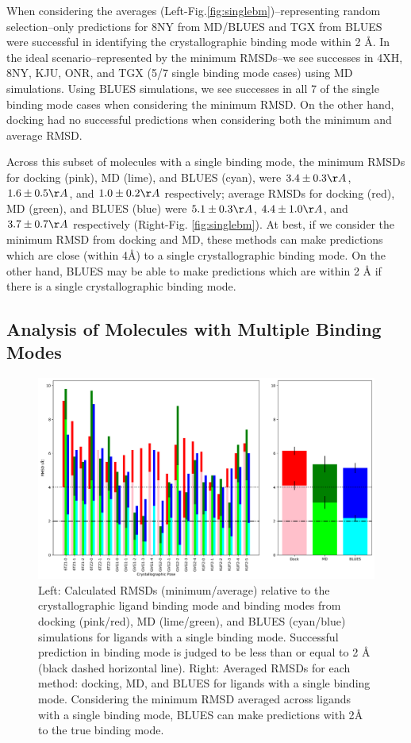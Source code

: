When considering the averages (Left-Fig.\ref{fig:singlebm})--representing random selection--only predictions for 8NY from MD/BLUES and TGX from BLUES were successful in identifying the crystallographic binding mode within 2 {\AA}.
In the ideal scenario--represented by the minimum RMSDs--we see successes in 4XH, 8NY, KJU, ONR, and TGX (5/7 single binding mode cases) using MD simulations.
Using BLUES simulations, we see successes in all 7 of the single binding mode cases when considering the minimum RMSD.
On the other hand, docking had no successful predictions when considering both the minimum and average RMSD.

Across this subset of molecules with a single binding mode, the minimum RMSDs for docking (pink), MD (lime), and BLUES (cyan), were $3.4 \pm 0.3 {\AA}$, $1.6 \pm 0.5 {\AA}$, and $1.0 \pm 0.2 {\AA}$ respectively; average RMSDs for docking (red), MD (green), and BLUES (blue) were $5.1 \pm 0.3 {\AA}$, $4.4 \pm 1.0 {\AA}$, and $3.7 \pm 0.7 {\AA}$ respectively (Right-Fig. \ref{fig:singlebm}).
At best, if we consider the minimum RMSD from docking and MD, these methods can make predictions which are close (within 4{\AA}) to a single crystallographic binding mode.
On the other hand, BLUES may be able to make predictions which are within 2 {\AA} if there is a single crystallographic binding mode.

\subsection{Analysis of Molecules with Multiple Binding Modes}

\begin{figure}
    \centering
    \includegraphics{chapter6/Figures/multibm.png}
    \caption[Multiple Binding Mode RMSDs]{Left: Calculated RMSDs (minimum/average) relative to the crystallographic ligand binding mode and binding modes from docking (pink/red), MD (lime/green), and BLUES (cyan/blue) simulations for ligands with a single binding mode. Successful prediction in binding mode is judged to be less than or equal to 2 {\AA} (black dashed horizontal line). Right: Averaged RMSDs for each method: docking, MD, and BLUES for ligands with a single binding mode. Considering the minimum RMSD averaged across ligands with a single binding mode, BLUES can make predictions with 2{\AA} to the true binding mode.}
    \label{fig:multibm}
\end{figure}

